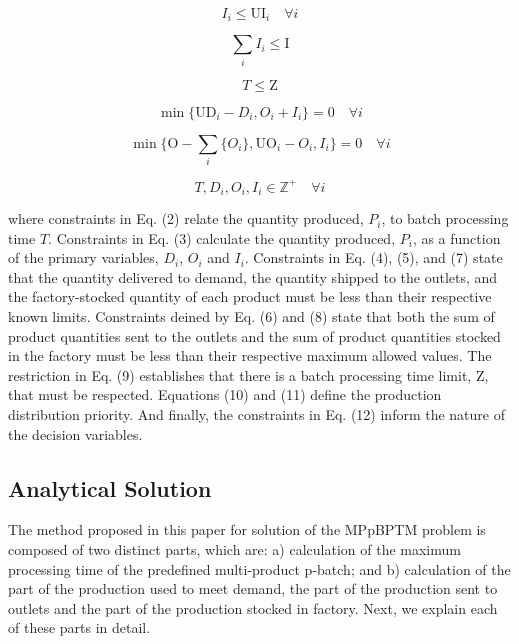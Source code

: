 \documentclass[10pt,fleqn,a4paper,twoside]{article}
\begin{document}
\begin{equation}
I_i \leq \textrm{UI}_i \quad \forall i
\end{equation}

\begin{equation}
\sum_i{I_i} \leq \textrm{I}
\end{equation}

\begin{equation}
T \leq \textrm{Z}
\end{equation}

\begin{equation}
\min \{\textrm{UD}_i - D_i, O_i + I_i\} = 0 \quad \forall i
\end{equation}

\begin{equation}
\min\{\textrm{O} - \sum_i\{ O_i\}, \textrm{UO}_i - O_i, I_i\} = 0 \quad \forall i
\end{equation}

\begin{equation}
\label{MBPTMP10}
T, D_i, O_i, I_i \in  \mathbb{Z}^ + \quad \forall i
\end{equation}

where constraints in Eq. (2) relate the quantity produced, $P_i$, to batch processing time $T$. Constraints in Eq. (3) calculate the quantity produced, $P_i$, as a function of the primary variables, $D_i$, $O_i$ and $I_i$. Constraints in Eq. (4), (5), and (7) state that the quantity delivered to demand, the quantity shipped to the outlets, and the factory-stocked quantity of each product must be less than their respective known limits. Constraints deined by Eq. (6) and (8) state that both the sum of product quantities sent to the outlets and the sum of product quantities stocked in the factory must be less than their respective maximum allowed values. The restriction in Eq. (9) establishes that there is a batch processing time limit, $\textrm{Z}$, that must be respected. Equations (10) and (11) define the production distribution priority. And finally, the constraints in Eq. (12) inform the nature of the decision variables.

\subsection{Analytical Solution}
\label{sec:analyticalSol}

The method proposed in this paper for solution of the MPpBPTM problem is composed of two distinct parts, which are: a) calculation of the maximum processing time of the predefined multi-product p-batch; and b) calculation of the part of the production used to meet demand, the part of the production sent to outlets and the part of the production stocked in factory. Next, we explain each of these parts in detail. \\
\end{document}
